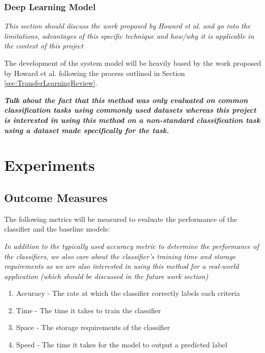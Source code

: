 \documentclass[a4paper,twoside,phd]{BYUPhys}
\begin{document}
\subsubsection{Deep Learning Model}
\label{sec:DLModels}

\textit{This section should discuss the work proposed by Howard et al. and go into the limitations, advantages of this specific technique and how/why it is applicable in the context of this project}

The development of the system model will be heavily based by the work proposed by Howard et al. \cite{Howard2018} following the process outlined in Section \ref{sec:TransferLearningReview}.

\textit{\textbf{Talk about the fact that this method was only evaluated on common classification tasks using commonly used datasets whereas this project is interested in using this method on a non-standard classification task using a dataset made specifically for the task.}}






\section{Experiments}
\label{sec:Experiments}

\subsection{Outcome Measures}
\label{sec:OutcomeMeasures}

The following metrics will be measured to evaluate the performance of the classifier and the baseline models:

\textit{In addition to the typically used accuracy metric to determine the performance of the classifiers, we also care about the classifier's training time and storage requirements as we are also interested in using this method for a real-world application (which should be discussed in the future work section)}

\begin{enumerate}[1)]
	\item Accuracy - The rate at which the classifier correctly labels each criteria
	\item Time - The time it takes to train the classifier
	\item Space - The storage requirements of the classifier
	\item Speed - The time it takes for the model to output a predicted label
\end{enumerate}
\end{document}
